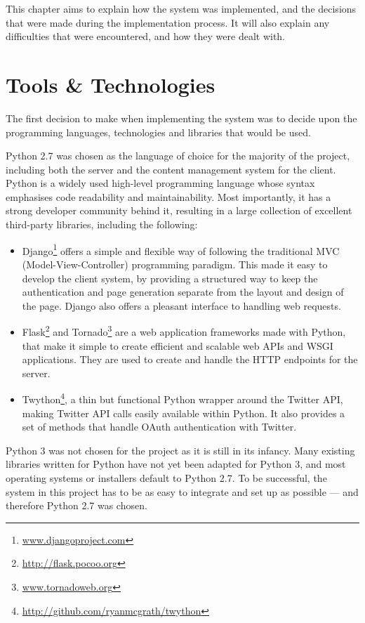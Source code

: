 \documentclass[11pt,a4paper]{report}
\begin{document}
This chapter aims to explain how the system was implemented, and the decisions that were made during the implementation process. It will also explain any difficulties that were encountered, and how they were dealt with.

\section{Tools \& Technologies}
The first decision to make when implementing the system was to decide upon the programming languages, technologies and libraries that would be used.

Python 2.7 was chosen as the language of choice for the majority of the project, including both the server and the content management system for the client. Python is a widely used high-level programming language whose syntax emphasises code readability and maintainability. Most importantly, it has a strong developer community behind it, resulting in a large collection of excellent third-party libraries, including the following:

\begin{itemize}
    \item Django\footnote{\url{www.djangoproject.com}} offers a simple and flexible way of following the traditional MVC (Model-View-Controller) programming paradigm. This made it easy to develop the client system, by providing a structured way to keep the authentication and page generation separate from the layout and design of the page. Django also offers a pleasant interface to handling web requests.
    \item Flask\footnote{\url{http://flask.pocoo.org}} and Tornado\footnote{\url{www.tornadoweb.org}} are a web application frameworks made with Python, that make it simple to create efficient and scalable web APIs and WSGI applications. They are used to create and handle the HTTP endpoints for the server.
    \item Twython\footnote{\url{http://github.com/ryanmcgrath/twython}}, a thin but functional Python wrapper around the Twitter API, making Twitter API calls easily available within Python. It also provides a set of methods that handle OAuth authentication with Twitter.
\end{itemize}

Python 3 was not chosen for the project as it is still in its infancy. Many existing libraries written for Python have not yet been adapted for Python 3, and most operating systems or installers default to Python 2.7. To be successful, the system in this project has to be as easy to integrate and set up as possible --- and therefore Python 2.7 was chosen.
\end{document}
